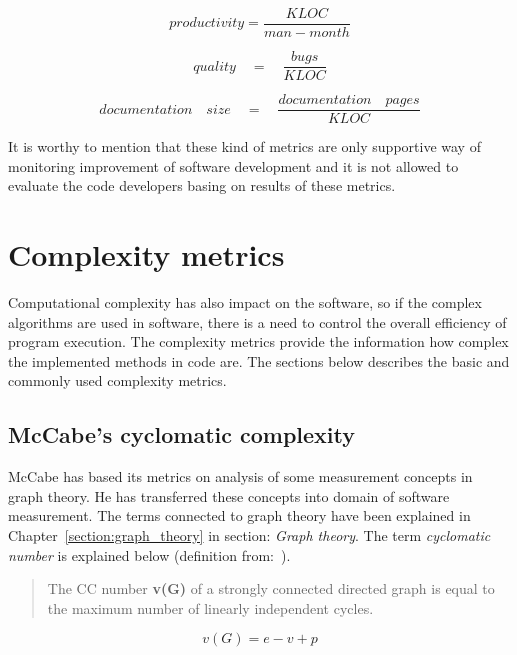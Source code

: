 \begin{equation}
productivity=\frac { KLOC }{ man-month } 
\end{equation}
 
 \begin{equation}
quality\quad =\quad \frac { bugs }{ KLOC } 
\end{equation}

\begin{equation}
documentation\quad size\quad =\quad \frac{documentation\quad pages }{KLOC} 
\end{equation}

It is worthy to mention that these kind of metrics are only supportive way of monitoring improvement of software development and it is not allowed to evaluate the code developers basing on results of these metrics. 

\section{Complexity metrics}

Computational complexity has also impact on the software, so if the complex algorithms are used in software, there is a need to control the overall efficiency of program execution. The complexity metrics provide the information how complex the implemented methods in code are. The sections below describes the basic and commonly used complexity metrics. 
 
\subsection{McCabe's cyclomatic complexity}
\label{sec:cyclomatic}
McCabe has based its metrics on analysis of some measurement concepts in graph theory. He has  transferred these concepts into domain of software measurement. The terms connected to graph theory have been explained in Chapter~\ref{section:graph_theory} in section: \textit{Graph theory}. The term \textit{cyclomatic number} is explained below (definition from:~\cite{alain}).

\begin{quote}
The \ac{CC} number \textbf{v(G)} of a strongly connected directed graph is equal to the
maximum number of linearly independent cycles.
\end{quote}\vspace{-1cm}

\begin{equation}
v(G) = e - v + p
\end{equation}

